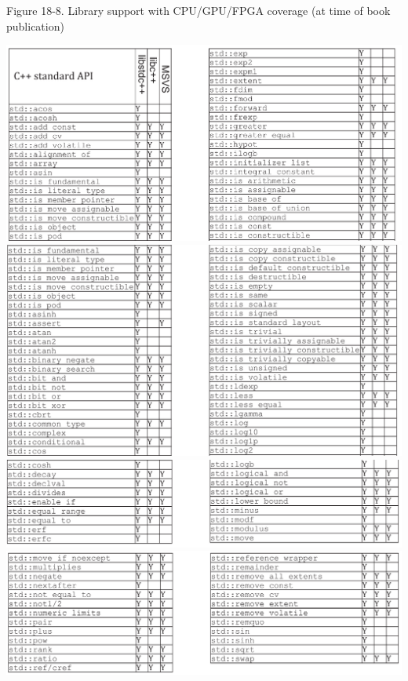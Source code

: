 \hspace*{\fill} \par %
Figure 18-8. Library support with CPU/GPU/FPGA coverage (at time of book publication)
\begin{center}
	\includegraphics[width=1.0\textwidth]{content/chapter-18/images/7}
	\includegraphics[width=1.0\textwidth]{content/chapter-18/images/8}
	\includegraphics[width=1.0\textwidth]{content/chapter-18/images/9}
	\includegraphics[width=1.0\textwidth]{content/chapter-18/images/10}
\end{center}

